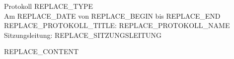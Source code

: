 \documentclass[12pt, a4paper]{scrartcl}
\newcommand*{\type}{REPLACE_TYPE}
\newcommand*{\sitzungstag}{REPLACE_DATE}
\newcommand*{\sitzungsbeginn}{REPLACE_BEGIN}
\newcommand*{\sitzungsende}{REPLACE_END}
\newcommand*{\protokollName}{REPLACE_PROTOKOLL_NAME}
\newcommand*{\protokollTitle}{REPLACE_PROTOKOLL_TITLE}
\newcommand*{\sitzungsleitung}{REPLACE_SITZUNGSLEITUNG}
\begin{document}
\begin{center}
{\LARGE Protokoll \type}\\[0.5cm]
{\large Am \sitzungstag{} von \sitzungsbeginn{} bis \sitzungsende}\\[0.8cm]
{\large \protokollTitle: \protokollName}\\
{\large Sitzungsleitung: \sitzungsleitung}\\[0.5cm]
\end{center}
REPLACE_CONTENT
\end{document}
